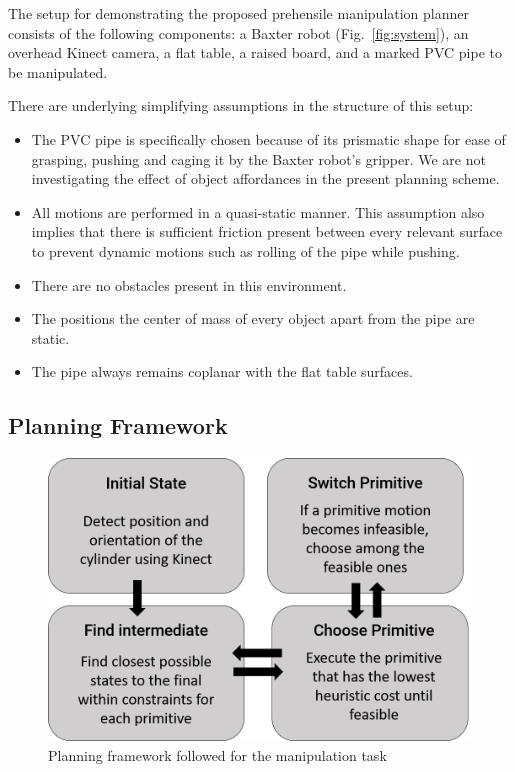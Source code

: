 \documentclass[runningheads,letterpaper]{llncs}
\begin{document}
The setup for demonstrating the proposed prehensile manipulation planner consists of the following components: a Baxter robot (Fig.~\ref{fig:system}), an overhead Kinect camera, a flat table, a raised board, and a marked PVC pipe to be manipulated.

There are underlying simplifying assumptions in the structure of this setup:
\begin{itemize}
\item
The PVC pipe is specifically chosen because of its prismatic shape for ease of grasping, pushing and caging it by the Baxter robot's gripper. We are not investigating the effect of object affordances in the present planning scheme. 
\item
All motions are performed in a quasi-static manner. This assumption also implies that there is sufficient friction present between every relevant surface to prevent dynamic motions such as rolling of the pipe while pushing. 
\item
There are no obstacles present in this environment.
\item
The positions the center of mass of every object apart from the pipe are static.
\item
The pipe always remains coplanar with the flat table surfaces. 
\end{itemize}

\subsection{Planning Framework}

\begin{figure}
\centering
	\includegraphics[width=0.8\columnwidth]{images/flow.png}
\caption{Planning framework followed for the manipulation task}
\label{fig:plan}
\end{figure}
\end{document}
